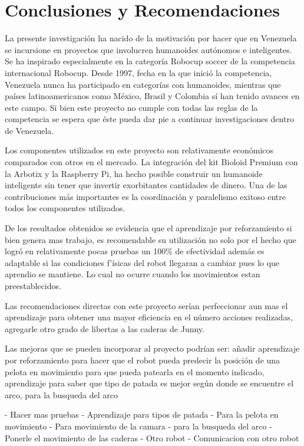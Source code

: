 \chapter{Conclusiones y Recomendaciones} \label{chapter:conclusiones}

\label{chap:conclusiones}

La presente investigación ha nacido de la motivación por hacer que en Venezuela se incursione en proyectos que involucren humanoides autónomos e inteligentes. Se ha inspirado especialmente en la categoría Robocup soccer de la competencia internacional Robocup. Desde 1997, fecha en la que inició la competencia, Venezuela nunca ha participado en categorías con humanoides, mientras que países latinoamericanos como México, Brasil y Colombia sí han tenido avances en este campo. Si bien este proyecto no cumple con todas las reglas de la competencia se espera que éste pueda dar pie a continuar investigaciones dentro de Venezuela.

Los componentes utilizados en este proyecto son relativamente económicos comparados con otros en el mercado. La integración del kit Bioloid Premium con la Arbotix y la Raspberry Pi, ha hecho posible construir un humanoide inteligente sin tener que invertir exorbitantes cantidades de dinero. Una de las contribuciones más importantes es la coordinación y paralelismo exitoso entre todos los componentes utilizados.

De los resultados obtenidos se evidencia que el aprendizaje por reforzamiento si bien genera mas trabajo, es recomendable su utilizaci\'on no solo por el hecho que logr\'o en relativamente pocas pruebas un 100\% de efectividad adem\'as es adaptable si las condiciones f'\'isicas del robot llegaran a cambiar pues lo que aprendio se mantiene. Lo cual no ocurre cuando los movimientos estan preestablecidos.
 
Las recomendaciones directas con este proyecto ser\'ian perfeccionar aun mas el aprendizaje para obtener una mayor eficiencia en el n\'umero acciones realizadas, agregarle otro grado de libertas a las caderas de Junny.

Las mejoras que se pueden incorporar al proyecto podrían ser: añadir aprendizaje por reforzamiento para hacer que el robot pueda predecir la posición de una pelota en movimiento para que pueda patearla en el momento indicado, aprendizaje para saber que tipo de patada es mejor seg\'un donde se encuentre el arco, para la busqueda del arco



- Hacer mas pruebas
- Aprendizaje para tipos de patada
- Para la pelota en movimiento
- Para movimiento de la camara
- para la busqueda del arco
- Ponerle el movimiento de las caderas
- Otro robot
- Comunicacion con otro robot
